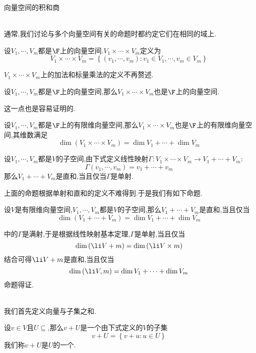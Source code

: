 \documentclass{ctexart}
\begin{document}
\pagestyle{empty}
\begin{center}\large 向量空间的积和商\end{center}
\\
通常,我们讨论与多个向量空间有关的命题时都约定它们在相同的域上.
\begin{definition}[1.1 定义:向量空间的积]
    设$V_1,\cdots,V_m$都是$\F$上的向量空间.$V_1\times\cdots\times V_m$定义为$$V_1\times\cdots\times V_m=\left\{\left(v_1,\cdots,v_m\right):v_1\in V_1,\cdots,v_m\in V_m\right\}$$
\end{definition}\noindent
$V_1\times\cdots\times V_m$上的加法和标量乘法的定义不再赘述.
\begin{formal}[1.2 向量空间的积是向量空间]
    设$V_1,\cdots,V_m$都是$\F$上的向量空间,那么$V_1\times\cdots\times V_m$也是$\F$上的向量空间.
\end{formal}\noindent
这一点也是容易证明的.
\begin{formal}[1.3 向量空间之积的维数]
    设$V_1,\cdots,V_m$都是$\F$上的有限维向量空间,那么$V_1\times\cdots\times V_m$也是$\F$上的有限维向量空间,其维数满足
    $$\dim\left(V_1\times\cdots\times V_m\right)=\dim V_1+\cdots+\dim V_m$$
\end{formal}
\begin{formal}[1.4 积与直和]
    设$V_1,\cdots,V_m$都是$V$的子空间,由下式定义线性映射$\Gamma:V_1\times\cdots\times V_m\to V_1+\cdots+V_m$:
    $$\Gamma(v_1,\cdots,v_m)=v_1+\cdots+v_m$$
    那么$V_1+\cdots+V_m$是直和,当且仅当$\Gamma$是单射.
\end{formal}\noindent
上面的命题根据单射和直和的定义不难得到.于是我们有如下命题.
\begin{formal}[1.5 直和与维数]
    设$V$是有限维向量空间,$V_1,\cdots,V_m$都是$V$的子空间,那么$V_1+\cdots+V_m$是直和,当且仅当
    $$\dim\left(V_1+\cdots+V_m\right)=\dim V_1+\cdots+\dim V_m$$
\end{formal}
\begin{solution}[Proof.]
    中的$\Gamma$是满射,于是根据线性映射基本定理,$\Gamma$是单射,当且仅当
    $$\dim\left(\li V+m\right)=\dim\left(\li V\times m\right)$$
    结合可得$\li V+m$是直和,当且仅当
    $$\dim\left(\li V,m\right)=\dim V_1+\cdots+\dim V_m$$
    命题得证.
\end{solution}\noindent
{}\\
我们首先定义向量与子集之和.
\begin{definition}[2.1 定义:向量与子集之和,平移]
    设$v\in V$且$U\subseteq$,那么$v+U$是一个由下式定义的$V$的子集
    $$v+U=\left\{v+u:u\in U\right\}$$
    我们称$v+U$是$U$的一个.
\end{definition}\noindent
\end{document}
